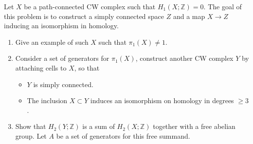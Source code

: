     \begin{problem}[]
        Let $X$ be a path-connected CW complex such that
        $H_1 \left( X ; \mathbb{Z} \right) = 0$.
        The goal of this problem is to construct a
        simply connected space $Z$ and a map
        $X \to Z$ inducing an isomorphism in homology.
        \begin{enumerate}
            \item Give an example of such $X$ such that
                $\pi_1 \left( X \right) \neq 1$.
            \item Consider a set of generators
                for $\pi_1 (X)$, construct another
                CW complex $Y$ by attaching cells to $X$,
                so that
                \begin{itemize}
                    \item $Y$ is simply connected.
                    \item The inclusion $X \subset Y$ 
                        induces an isomorphism on homology
                        in degrees $\ge 3$.
                \end{itemize}
            \item Show that $H_2 \left( Y ; \mathbb{Z} \right) $ 
                is a sum of $H_2 \left( X; \mathbb{Z} \right) $ 
                together with a free abelian group.
                Let $A$ be a set of generators for this
                free summand.
        \end{enumerate}
    \end{problem}


